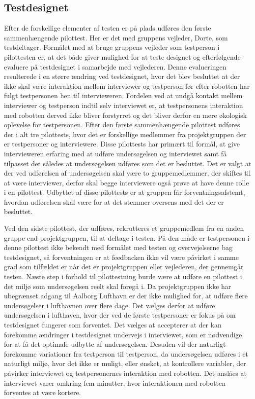 \subsection{Testdesignet}
\label{ParametrePilotTestdesign}
%
Efter de forskellige elementer af testen er på plads udføres den første sammenhængende pilottest. Her er det med gruppens vejleder, Dorte, som testdeltager. Formålet med at bruge gruppens vejleder som testperson i pilottesten er, at det både giver mulighed for at teste designet og efterfølgende evaluere på testdesignet i samarbejde med vejlederen. Denne evalueringen resulterede i en større ændring ved testdesignet, hvor det blev besluttet at der ikke skal være interaktion mellem interviewer og testperson før efter robotten har fulgt testpersonen hen til intervieweren. Fordelen ved at undgå kontakt mellem interviewer og testperson indtil selv interviewet er, at testpersonens interaktion med robotten derved ikke bliver forstyrret og det bliver derfor en mere økologisk oplevelse for testpersonen. \blankline
%
Efter den første sammenhængende pilottest udføres der i alt tre pilottests, hvor det er forskellige medlemmer fra projektgruppen der er testpersoner og interviewere. Disse pilottests har primært til formål, at give intervieweren erfaring med at udføre undersøgelsen og interviewet samt få tilpasset det således at undersøgelsen udføres som det er besluttet. Det er valgt at der ved udførelsen af undersøgelsen skal være to gruppemedlemmer, der skiftes til at være interviewer, derfor skal begge interviewere også prøve at have denne rolle i en pilottest. Udbyttet af disse pilottests er at gruppen får forventningsafstemt, hvordan udførelsen skal være for at det stemmer oversens med det der er besluttet.

Ved den sidste pilottest, der udføres, rekrutteres et gruppemedlem fra en anden gruppe end projektgruppen, til at deltage i testen. På den måde er testpersonen i denne pilottest ikke bekendt med formålet med testen og overvejelserne bag testdesignet, så forventningen er at feedbacken ikke vil være påvirket i samme grad som tilfældet er når det er projektgruppen eller vejlederen, der gennemgår testen. \blankline
%
Næste step i forhold til pilottestning burde være at udføre en pilottest i det miljø som undersøgelsen reelt skal foregå i. Da projektgruppen ikke har ubegrænset adgang til Aalborg Lufthavn er der ikke mulighed for, at udføre flere undersøgelser i lufthavnen over flere dage. Det vælges derfor at udføre undersøgelsen i lufthaven, hvor der ved de første testpersoner er fokus på om testdesignet fungerer som forventet. Det vælges at accepterer at der kan forekomme ændringer i testdesignet undervejs i interviewet, som er nødvendige for at få det optimale udbytte af undersøgelsen. Desuden vil der naturligt forekomme variationer fra testperson til testperson, da undersøgelsen udføres i et naturligt miljø, hvor det ikke er muligt, eller ønsket, at kontrollere variabler, der påvirker interviewet og testpersonernes interaktion med robotten. Det anslåes at interviewet varer omkring fem minutter, hvor interaktionen med robotten forventes at være kortere. 
